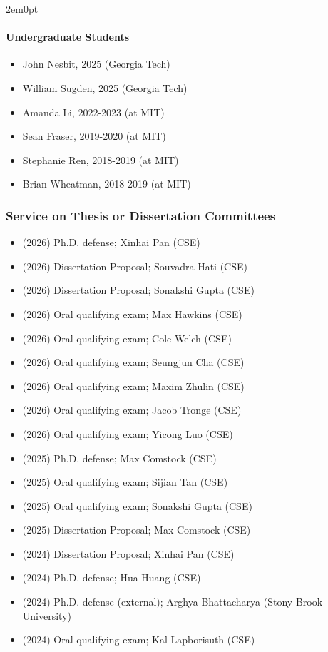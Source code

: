 \begin{adjustwidth}{2em}{0pt}
\paragraph{Undergraduate Students}

\begin{itemize}
\item John Nesbit, 2025 (Georgia Tech)
    \item William Sugden, 2025 (Georgia Tech)
\item Amanda Li, 2022-2023 (at MIT)
    \item Sean Fraser, 2019-2020 (at MIT)
    \item Stephanie Ren, 2018-2019 (at MIT)
    \item Brian Wheatman, 2018-2019 (at MIT)
\end{itemize}

\subsubsection{Service on Thesis or Dissertation Committees}

\begin{itemize}
    \item (2026) Ph.D. defense; Xinhai Pan (CSE)
\item (2026) Dissertation Proposal; Souvadra Hati (CSE)
\item (2026) Dissertation Proposal; Sonakshi Gupta (CSE)
\item (2026) Oral qualifying exam; Max Hawkins (CSE)
\item (2026) Oral qualifying exam; Cole Welch (CSE)
\item (2026) Oral qualifying exam; Seungjun Cha (CSE)
\item (2026) Oral qualifying exam; Maxim Zhulin (CSE)
\item (2026) Oral qualifying exam; Jacob Tronge (CSE)
 \item (2026) Oral qualifying exam; Yicong Luo (CSE)
   \item (2025) Ph.D. defense; Max Comstock (CSE)
\item (2025) Oral qualifying exam; Sijian Tan (CSE)
\item (2025) Oral qualifying exam; Sonakshi Gupta (CSE)
    \item (2025) Dissertation Proposal; Max Comstock (CSE)
    \item (2024) Dissertation Proposal; Xinhai Pan (CSE)
    \item (2024) Ph.D. defense; Hua Huang (CSE)
     \item (2024) Ph.D. defense (external); Arghya Bhattacharya (Stony Brook University)
    \item (2024) Oral qualifying exam; Kal Lapborisuth (CSE)
\end{itemize}


\end{adjustwidth}
